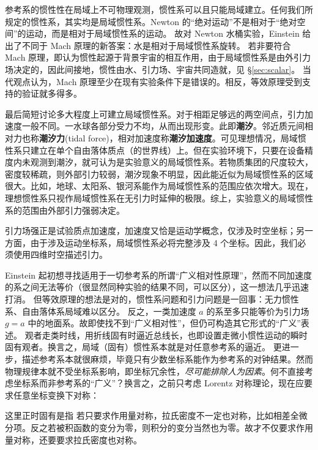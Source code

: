 参考系的惯性性在局域上不可物理观测，惯性系可以且只能局域建立。任何我们所规定的惯性系，其实均是局域惯性系。Newton 的“绝对运动”不是相对于“绝对空间”的运动，而是相对于局域惯性系的运动。
故对 Newton 水桶实验，Einstein 给出了不同于 Mach 原理的新答案：水是相对于局域惯性系旋转。
若非要符合 Mach 原理，即认为惯性起源于背景宇宙的相互作用，由于局域惯性系是由外引力场决定的，因此间接地，惯性由水、引力场、宇宙共同造就，见 \S\ref{sec:scalar}。
当代观点认为，Mach 原理至少在现有实验条件下是错误的。相反，等效原理受到支持的验证就多得多。

最后简短讨论多大程度上可建立局域惯性系。对于相距足够远的两空间点，引力加速度一般不同。一水球各部分受力不均，从而出现形变。此即\textbf{潮汐}。邻近质元间相对力也称\textbf{潮汐力}(tidal force)，相对加速度称\textbf{潮汐加速度}。可见理想情况，局域惯性系只建立在单个自由落体质点（的世界线）上。但在实验环境下，只要在设备精度内未观测到潮汐，就可认为是实验意义的局域惯性系。若物质集团的尺度较大，密度较稀疏，则外部引力较弱，潮汐现象不明显，因此能近似为局域惯性系的区域很大。比如，地球、太阳系、银河系能作为局域惯性系的范围应依次增大。现在，理想惯性系只视作局域惯性系在无引力时延伸的极限。综上，实验意义的局域惯性系的范围由外部引力强弱决定。

引力场强正是试验质点加速度，加速度又恰是运动学概念，仅涉及时空坐标；另一方面，由于涉及运动坐标系，局域惯性系必将完整涉及 4 个坐标。因此，我们必须使用四维时空描述引力。
\begin{center}
\end{center}
Einstein 起初想寻找适用于一切参考系的所谓“广义相对性原理”，然而不同加速度的系之间无法等价（很显然同种实验的结果不同，可以区分），这一想法几乎迅速打消。
但等效原理的想法是对的，惯性系问题和引力问题是一回事：无力惯性系、自由落体系局域难以区分。
反之，一类加速度 $a$ 的系至多只能等价为引力场 $g=a$ 中的地面系。故即使找不到“广义相对性”，但仍可构造其它形式的“广义”表述。
观者走类时线，用折线固有时逼近总线长，也即设置走微小惯性运动的瞬时固有观者。换言之，局域（固有）惯性系本就是对任意参考系的逼近。
更进一步，描述参考系本就很麻烦，毕竟只有少数坐标系能作为参考系的对钟结果。然而物理规律本就不受坐标系影响，即坐标冗余性，\textit{尽可能排除人为因素}。何不直接考虑坐标系而非参考系的“广义”？换言之，之前只考虑 Lorentz 对称理论，现在应要求任意坐标变换下对称：
\begin{center}
\end{center}
这里正时固有是指
若只要求作用量对称，拉氏密度不一定也对称，比如相差全微分项。反之若被积函数的变分为零，则积分的变分当然也为零。故才不仅要求作用量对称，还要要求拉氏密度也对称。


